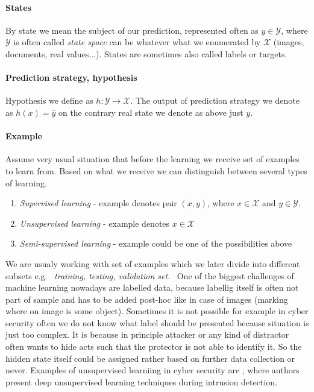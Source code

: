 \paragraph{States}
By state we mean the subject of our prediction, represented often as $y \in \mathcal{Y}$, where $\mathcal{Y}$ is often called \emph{state space} can be whatever what we enumerated by $\mathcal{X}$ (images, documents, real values...). States are sometimes also called labels or targets. 
\paragraph{Prediction strategy, hypothesis}
Hypothesis we define as $h:\mathcal{Y} \rightarrow \mathcal{X}$. The output of prediction strategy we denote as $h(x)=\hat{y}$ on the contrary real state we denote as above just $y$.
\paragraph{Example}
Assume very usual situation that before the learning we receive set of examples to learn from. Based on what we receive we can distinguish between several types of learning. \
\begin{enumerate}
    \item \emph{Supervised learning} - example denotes pair $(x,y)$, where $x\in \mathcal{X}$ and $y\in \mathcal{Y}$. 
    \item \emph{Unsupervised learning} - example denotes $x\in \mathcal{X}$
    \item \emph{Semi-supervised learning} - example could be one of the possibilities above
\end{enumerate}
We are usualy working with set of examples which we later divide into different subsets e.g. \ \emph{training, testing, validation set}. \
One of the biggest challenges of machine learning nowadays are labelled data, because labellig itself is often not part of sample and has to be added post-hoc like in case of images (marking where on image is some object). Sometimes it is not possible for example in cyber security often we do not know what label should be presented because situation is just too complex. It is because in principle attacker or any kind of distractor often wants to hide acts such that the protector is not able to identify it. So the hidden state itself could be assigned rather based on further data collection or never. Examples of unsupervised learniing in cyber security are \cite{Alom2017}, where authors present deep unsupervised learning techniques during intrusion detection.

